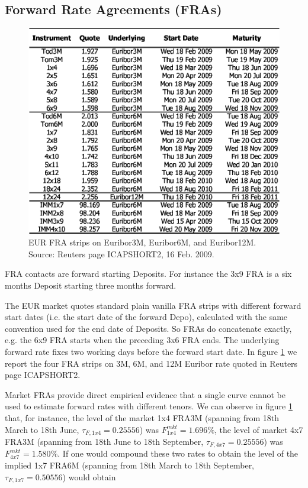 \documentclass[11pt,reqno]{amsart}
\begin{document}
\subsection{Forward Rate Agreements (FRAs)}
\label{sec:FRA}
\begin{figure}[tbp]
\centering
\includegraphics[scale=0.9]{./FigMktFRA}
\caption{EUR FRA strips on Euribor3M, Euribor6M, and Euribor12M. Source: Reuters page ICAPSHORT2, 16 Feb. 2009.}
\label{fig:FRA}
\end{figure}
FRA contacts are forward starting Deposits. For instance the 3x9 FRA is a six months Deposit starting three months forward.
\par
The EUR market quotes standard plain vanilla FRA strips with different forward start dates (i.e. the start date of the forward Depo), calculated with the same convention used for the end date of Deposits. So FRAs do concatenate exactly, e.g. the 6x9 FRA starts when the preceding 3x6 FRA ends. The underlying forward rate fixes two working days before the forward start date.
In figure \ref{fig:FRA} we report the four FRA strips on 3M, 6M, and 12M Euribor rate quoted in Reuters page ICAPSHORT2.
\par
Market FRAs provide direct empirical evidence that a single curve cannot be used to estimate forward rates with different tenors. We can observe in figure \ref{fig:FRA} that, for instance, the level of the market 1x4 FRA3M (spanning from 18th March to 18th June, $\tau_{F,1x4} = 0.25556$) was $F_{1x4}^{mkt} = 1.696\%$, the level of market 4x7 FRA3M (spanning from 18th June to 18th September, $\tau_{F,4x7} = 0.25556$) was $F_{4x7}^{mkt}=1.580\%$. If one would compound these two rates to obtain the level of the implied 1x7 FRA6M (spanning from 18th March to 18th September, $\tau_{F,1x7} = 0.50556$) would obtain
\end{document}
